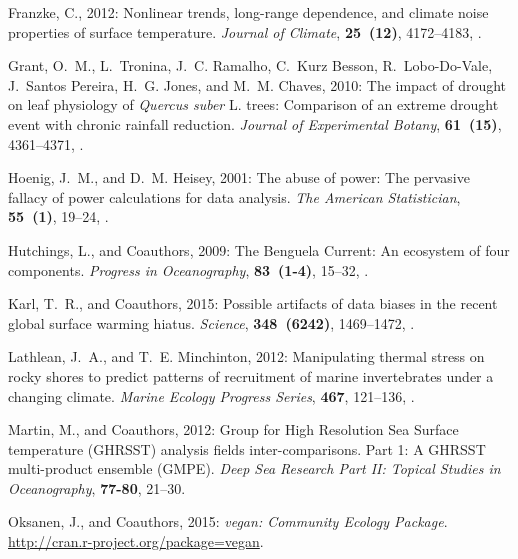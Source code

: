 \documentclass{ametsoc}
\begin{document}
\begin{thebibliography}{23}
Franzke, C., 2012: {Nonlinear trends, long-range dependence, and climate noise
  properties of surface temperature}. \textit{Journal of Climate},
  \textbf{25~(12)}, 4172--4183, .

Grant, O.~M., L.~Tronina, J.~C. Ramalho, C.~{Kurz Besson}, R.~Lobo-Do-Vale,
  J.~{Santos Pereira}, H.~G. Jones, and M.~M. Chaves, 2010: {The impact of
  drought on leaf physiology of \textit{Quercus suber} L. trees: Comparison of an
  extreme drought event with chronic rainfall reduction}. \textit{Journal of
  Experimental Botany}, \textbf{61~(15)}, 4361--4371, .

Hoenig, J.~M., and D.~M. Heisey, 2001: {The abuse of power: The pervasive
  fallacy of power calculations for data analysis}. \textit{The American
  Statistician}, \textbf{55~(1)}, 19--24, .

Hutchings, L., and Coauthors, 2009: {The Benguela Current: An ecosystem of four
  components}. \textit{Progress in Oceanography}, \textbf{83~(1-4)}, 15--32,
  .

Karl, T.~R., and Coauthors, 2015: {Possible artifacts of data biases in the
  recent global surface warming hiatus}. \textit{Science}, \textbf{348~(6242)},
  1469--1472, .

Lathlean, J.~A., and T.~E. Minchinton, 2012: {Manipulating thermal stress on
  rocky shores to predict patterns of recruitment of marine invertebrates under
  a changing climate}. \textit{Marine Ecology Progress Series}, \textbf{467},
  121--136, .

Martin, M., and Coauthors, 2012: {Group for High Resolution Sea Surface
  temperature (GHRSST) analysis fields inter-comparisons. Part 1: A GHRSST
  multi-product ensemble (GMPE)}. \textit{Deep Sea Research Part II: Topical
  Studies in Oceanography}, \textbf{77-80}, 21--30.

Oksanen, J., and Coauthors, 2015: \textit{{vegan: Community Ecology Package}}.
  \urlprefix\url{http://cran.r-project.org/package=vegan}.


\end{thebibliography}
\end{document}
